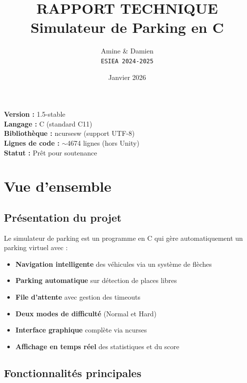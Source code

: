 \documentclass[12pt,a4paper]{article}
\title{\textbf{RAPPORT TECHNIQUE} \\ Simulateur de Parking en C}
\author{
    Amine \& Damien \\
    \texttt{ESIEA 2024-2025}
}
\date{Janvier 2026}
\begin{document}
\maketitle

\begin{center}
\textbf{Version :} 1.5-stable \\
\textbf{Langage :} C (standard C11) \\
\textbf{Bibliothèque :} ncursesw (support UTF-8) \\
\textbf{Lignes de code :} $\sim$4674 lignes (hors Unity) \\
\vspace{1cm}
\textbf{Statut :} \checkmark{} Prêt pour soutenance
\end{center}

\newpage
\tableofcontents
\newpage


\section{Vue d'ensemble}

\subsection{Présentation du projet}

Le simulateur de parking est un programme en C qui gère automatiquement un parking virtuel avec :

\begin{itemize}
    \item \textbf{Navigation intelligente} des véhicules via un système de flèches
    \item \textbf{Parking automatique} sur détection de places libres
    \item \textbf{File d'attente} avec gestion des timeouts
    \item \textbf{Deux modes de difficulté} (Normal et Hard)
    \item \textbf{Interface graphique} complète via ncurses
    \item \textbf{Affichage en temps réel} des statistiques et du score
\end{itemize}

\subsection{Fonctionnalités principales}
\end{document}
